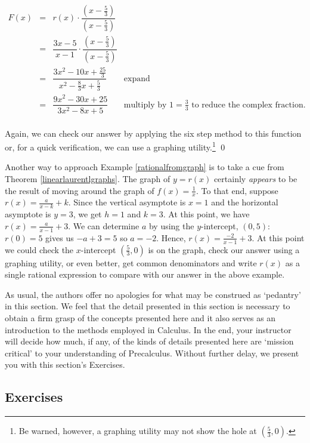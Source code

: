 \documentclass{ximera}
\begin{document}
\begin{example}
\[ \begin{array}{rclr}

F(x) & = &  r(x) \cdot \dfrac{\left(x - \frac{5}{3} \right)}{\left(x - \frac{5}{3} \right)} & \\
       & = &  \dfrac{3x-5}{x-1} \cdot \dfrac{\left(x - \frac{5}{3} \right)}{\left(x - \frac{5}{3} \right)} & \\
       & = & \dfrac{3x^2-10x+\frac{25}{3}}{x^2 - \frac{8}{3} x + \frac{5}{3}} & \text{expand}\\
       & = & \dfrac{9x^2-30x+25}{3x^2-8x+5} & \text{multiply by $1 = \frac{3}{3}$ to reduce the complex fraction.}\\ \end{array} \]

Again, we can check our answer by applying the six step method to this function or, for a quick verification, we can use a graphing utility.\footnote{Be warned, however, a graphing utility may not show the hole at  $\left(\frac{5}{3}, 0 \right)$.} \qed
 

\end{example}

Another way to approach Example \ref{rationalfromgraph} is to take a cue from Theorem \ref{linearlaurentlgraphs}.  The graph of $y=r(x)$ certainly \textit{appears} to be the result of moving around the graph of $f(x) = \frac{1}{x}$.  To that end, suppose $r(x) = \frac{a}{x-k} + k$.  Since the vertical asymptote is $x=1$ and the horizontal asymptote is $y=3$, we get $h=1$ and $k=3$.  At this point, we have $r(x) = \frac{a}{x-1}+3$.  We can determine $a$ by using the $y$-intercept, $(0,5)$:  $r(0) =5$ gives us $-a+3 = 5$ so $a = -2$.  Hence, $r(x) = \frac{-2}{x-1}+3$.  At this point we could check the $x$-intercept  $\left(\frac{5}{3}, 0 \right)$ is on the graph, check our answer using a graphing utility, or even better, get common denominators and write $r(x)$ as a single rational expression to compare with our answer in the above example.  

As usual, the authors offer no apologies for what may be construed as `pedantry' in this section.  We feel that the detail presented in this section is necessary to obtain a firm grasp of the concepts presented here and it also serves as an introduction to the methods employed in Calculus. In the end,  your instructor will decide how much, if any, of the kinds of details presented here are `mission critical' to your understanding of Precalculus. Without further delay, we present you with this section's Exercises.

\newpage

\subsection{Exercises}


\closegraphsfile
\end{document}
